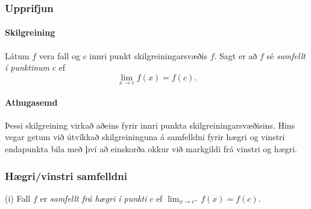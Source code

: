 \documentclass[icelandic,a4paper,12pt]{article}
\begin{document}
\date{10.~september 2012}




	\maketitle


\subsubsection*{Upprifjun}
	\pause
 \paragraph{Skilgreining}
	Látum $f$ vera fall og $c$ innri punkt skilgreiningarsvæðis $f$.  Sagt
	er að $f$ sé {\em samfellt í punktinum} $c$ ef
	$$\lim_{x\rightarrow c}f(x)=f(c).$$
 
	\pause
 \paragraph{Athugasemd}
	Þessi skilgreining virkað aðeins fyrir innri punkta skilgreiningarsvæðisins.
	Hins vegar getum við útvíkkað skilgreininguna á samfelldni fyrir 
	hægri og vinstri endapunkta bila með því að einskorða okkur
	við markgildi frá vinstri og hægri.
 


\subsubsection*{Hægri/vinstri samfelldni}	
		(i)  Fall $f$ er {\em samfellt frá hægri í punkti} $c$ ef
  $\lim_{x\rightarrow c^+}f(x)=f(c)$.
  
\end{document}
